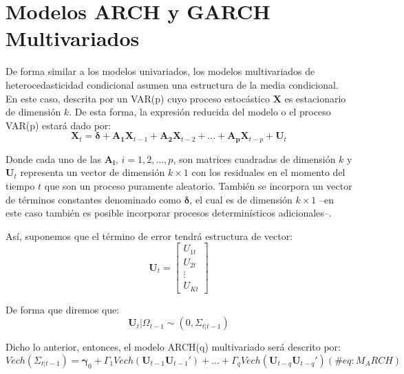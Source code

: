 \documentclass[
]{book}
\begin{document}
\hypertarget{modelos-arch-y-garch-multivariados}{%
\section{Modelos ARCH y GARCH Multivariados}\label{modelos-arch-y-garch-multivariados}}

De forma similar a los modelos univariados, los modelos multivariados de heterocedasticidad condicional asumen una estructura de la media condicional. En este caso, descrita por un VAR(p) cuyo proceso estocástico \(\mathbf{X}\) es estacionario de dimensión \(k\). De esta forma, la expresión reducida del modelo o el proceso VAR(p) estará dado por:
\begin{equation}
    \mathbf{X}_t = \boldsymbol{\delta} + \mathbf{A_1} \mathbf{X}_{t-1} + \mathbf{A_2} \mathbf{X}_{t-2} + \ldots + \mathbf{A_p} \mathbf{X}_{t-p} + \mathbf{U}_{t}
\end{equation}

Donde cada uno de las \(\mathbf{A_i}\), \(i = 1, 2, \ldots, p\), son matrices cuadradas de dimensión \(k\) y \(\mathbf{U}_t\) representa un vector de dimensión \(k \times 1\) con los residuales en el momento del tiempo \(t\) que son un proceso puramente aleatorio. También se incorpora un vector de términos constantes denominado como \(\boldsymbol{\delta}\), el cual es de dimensión \(k \times 1\) --en este caso también es posible incorporar procesos determinísticos adicionales--.

Así, suponemos que el término de error tendrá estructura de vector:
\begin{equation*}
    \mathbf{U}_t = 
    \begin{bmatrix}
    U_{1t} \\ U_{2t} \\ \vdots \\ U_{Kt}
    \end{bmatrix}
\end{equation*}

De forma que diremos que:
\begin{equation*}
    \mathbf{U}_t | \Omega_{t-1} \sim (0, \Sigma_{t | t-1})
\end{equation*}

Dicho lo anterior, entonces, el modelo ARCH(q) multivariado será descrito por:
\begin{equation}
    Vech(\Sigma_{t | t-1}) = \boldsymbol{\gamma}_0 + \Gamma_1 Vech(\mathbf{U}_{t-1} \mathbf{U}_{t-1}') + \ldots + \Gamma_q Vech(\mathbf{U}_{t-q} \mathbf{U}_{t-q}')
    (\#eq:M_ARCH)
\end{equation}
\end{document}
